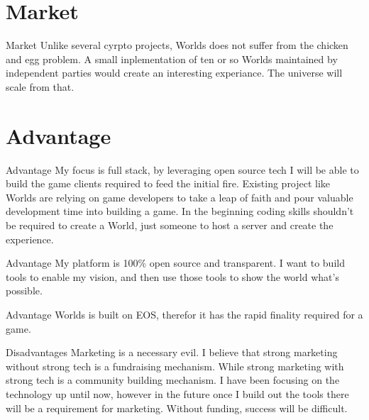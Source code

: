 \documentclass[final, ngerman, xcolor=pdftex, dvipsnames, table, aspectratio=169, 14pt]{beamer}
\begin{document}
\section{Market}
\begin{frame}{Market}
Unlike several cyrpto projects, Worlds does not suffer from the chicken and egg problem. A small inplementation of ten or so Worlds maintained by independent parties would create an interesting experiance. The universe will scale from that.
\end{frame}

\section{Advantage}
\begin{frame}{Advantage}
My focus is full stack, by leveraging open source tech I will be able to build the game clients required to feed the initial fire. Existing project like Worlds are relying on game developers to take a leap of faith and pour valuable development time into building a game. In the beginning coding skills shouldn't be required to create a World, just someone to host a server and create the experience. 
\end{frame}

\begin{frame}{Advantage}
My platform is 100\% open source and transparent. I want to build tools to enable my vision, and then use those tools to show the world what's possible.
\end{frame}

\begin{frame}{Advantage}
Worlds is built on EOS, therefor it has the rapid finality required for a game. 
\end{frame}

\begin{frame}{Disadvantages}
Marketing is a necessary evil. I believe that strong marketing without strong tech is a fundraising mechanism. While strong marketing with strong tech is a community building mechanism. I have been focusing on the technology up until now, however in the future once I build out the tools there will be a requirement for marketing. Without funding, success will be difficult.  
\end{frame}
\end{document}
